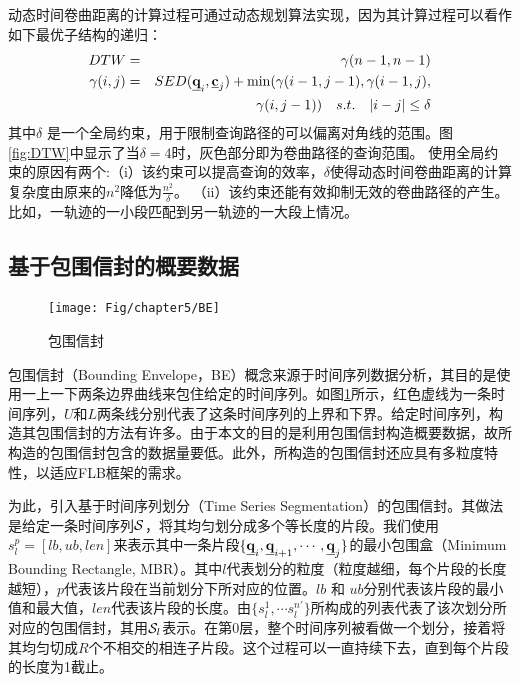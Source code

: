 动态时间卷曲距离的计算过程可通过动态规划算法实现，因为其计算过程可以看作如下最优子结构的递归：
\begin{eqnarray}\label{eq:dtwdef}
DTW&=&\gamma(n-1,n-1) \\ \nonumber
\gamma(i,j)&=&SED(\emph{{\textbf{q}}}_{i}, \emph{{\textbf{c}}}_{j}) + \min(\gamma(i-1,j-1), \gamma(i-1,j), \nonumber \\
&&\gamma(i,j-1))  \quad s.t.  \quad |i-j| \le \delta
\end{eqnarray}
其中$\delta$ 是一个全局约束，用于限制查询路径的可以偏离对角线的范围。图\ref{fig:DTW}中显示了当$\delta=4$时，灰色部分即为卷曲路径的查询范围。
使用全局约束的原因有两个:（i）该约束可以提高查询的效率，$\delta$使得动态时间卷曲距离的计算复杂度由原来的$n^2$降低为$\frac{n^2}{\delta}$。
（ii）该约束还能有效抑制无效的卷曲路径的产生。比如，一轨迹的一小段匹配到另一轨迹的一大段上情况。


\subsection{基于包围信封的概要数据}\label{sec-c5-BE}
\begin{figure}[t]
	\centering
	\texttt{[image: Fig/chapter5/BE]}
	\caption{包围信封}
	\label{fig:BE}
\end{figure}
包围信封（Bounding Envelope，BE）概念来源于时间序列数据分析，其目的是使用一上一下两条边界曲线来包住给定的时间序列。如图\ref{fig:BE}所示，红色虚线为一条时间序列，$U$和$L$两条线分别代表了这条时间序列的上界和下界。给定时间序列，构造其包围信封的方法有许多。由于本文的目的是利用包围信封构造概要数据，故所构造的包围信封包含的数据量要低。此外，所构造的包围信封还应具有多粒度特性，以适应FLB框架的需求。

为此，引入基于时间序列划分（Time Series Segmentation）的包围信封。其做法是给定一条时间序列$\cal S$，将其均匀划分成多个等长度的片段。我们使用$s_{l}^{p}= {[lb, ub, len]}$来表示其中一条片段$\{\emph{{\textbf{q}}}_{i}, \emph{{\textbf{q}}}_{i+1}, \cdots, \emph{{\textbf{q}}}_{j} \}$的最小包围盒（Minimum Bounding Rectangle, MBR）。其中$l$代表划分的粒度（粒度越细，每个片段的长度越短），$p$代表该片段在当前划分下所对应的位置。$lb$ 和 $ub$分别代表该片段的最小值和最大值，$len$代表该片段的长度。由$\{s_{l}^{1}, \cdots s_{l}^{n'}\}$所构成的列表代表了该次划分所对应的包围信封，其用${\cal S}_{l}$表示。在第0层，整个时间序列被看做一个划分，接着将其均匀切成$R$个不相交的相连子片段。这个过程可以一直持续下去，直到每个片段的长度为1截止。

